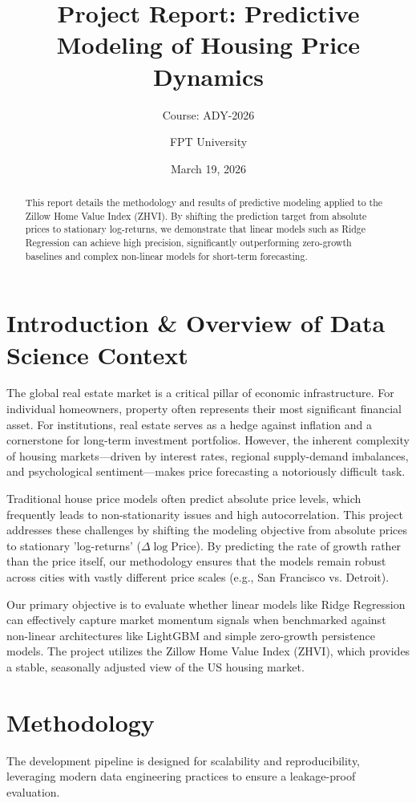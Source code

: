 \documentclass[11pt,a4paper]{article}
\title{Project Report: Predictive Modeling of Housing Price Dynamics}
\author{Course: ADY-2026 \and FPT University}
\date{March 19, 2026}
\begin{document}
\maketitle

\begin{abstract}
This report details the methodology and results of predictive modeling applied to the Zillow Home Value Index (ZHVI). By shifting the prediction target from absolute prices to stationary log-returns, we demonstrate that linear models such as Ridge Regression can achieve high precision, significantly outperforming zero-growth baselines and complex non-linear models for short-term forecasting.
\end{abstract}

\section{Introduction \& Overview of Data Science Context}
\label{sec:intro}
The global real estate market is a critical pillar of economic infrastructure. For individual homeowners, property often represents their most significant financial asset. For institutions, real estate serves as a hedge against inflation and a cornerstone for long-term investment portfolios. However, the inherent complexity of housing markets---driven by interest rates, regional supply-demand imbalances, and psychological sentiment---makes price forecasting a notoriously difficult task.

Traditional house price models often predict absolute price levels, which frequently leads to non-stationarity issues and high autocorrelation. This project addresses these challenges by shifting the modeling objective from absolute prices to stationary 'log-returns' ($\Delta \log \text{Price}$). By predicting the rate of growth rather than the price itself, our methodology ensures that the models remain robust across cities with vastly different price scales (e.g., San Francisco vs. Detroit).

Our primary objective is to evaluate whether linear models like Ridge Regression can effectively capture market momentum signals when benchmarked against non-linear architectures like LightGBM and simple zero-growth persistence models. The project utilizes the Zillow Home Value Index (ZHVI), which provides a stable, seasonally adjusted view of the US housing market.

\section{Methodology}
\label{sec:methodology}
The development pipeline is designed for scalability and reproducibility, leveraging modern data engineering practices to ensure a leakage-proof evaluation.
\end{document}
